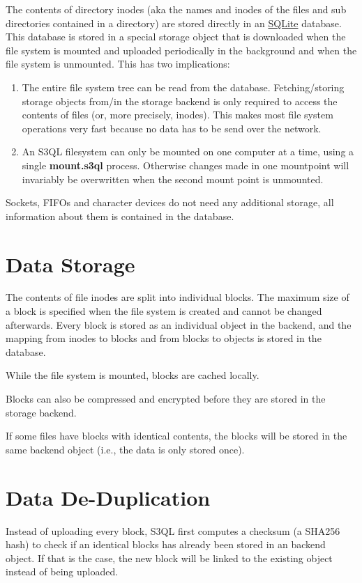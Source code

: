 \documentclass[letterpaper,10pt,english]{sphinxmanual}
\begin{document}
The contents of directory inodes (aka the names and inodes of the
files and sub directories contained in a directory) are stored
directly in an \href{http://www.sqlite.org/}{SQLite} database. This database
is stored in a special storage object that is downloaded when the file
system is mounted and uploaded periodically in the background and when
the file system is unmounted. This has two implications:
\begin{enumerate}
\item {} 
The entire file system tree can be read from the
database. Fetching/storing storage objects from/in the storage
backend is only required to access the contents of files (or, more
precisely, inodes). This makes most file system operations very
fast because no data has to be send over the network.

\item {} 
An S3QL filesystem can only be mounted on one computer at a time,
using a single \textbf{mount.s3ql} process. Otherwise changes made in
one mountpoint will invariably be overwritten when the second mount
point is unmounted.

\end{enumerate}

Sockets, FIFOs and character devices do not need any additional
storage, all information about them is contained in the database.


\section{Data Storage}
\label{impl_details:data-storage}
The contents of file inodes are split into individual blocks. The
maximum size of a block is specified when the file system is created
and cannot be changed afterwards. Every block is stored as an
individual object in the backend, and the mapping from inodes to
blocks and from blocks to objects is stored in the database.

While the file system is mounted, blocks are cached locally.

Blocks can also be compressed and encrypted before they are stored in
the storage backend.

If some files have blocks with identical contents, the blocks will be
stored in the same backend object (i.e., the data is only stored
once).


\section{Data De-Duplication}
\label{impl_details:data-de-duplication}
Instead of uploading every block, S3QL first computes a checksum (a
SHA256 hash) to check if an identical blocks has already been stored
in an backend object. If that is the case, the new block will be
linked to the existing object instead of being uploaded.
\end{document}

